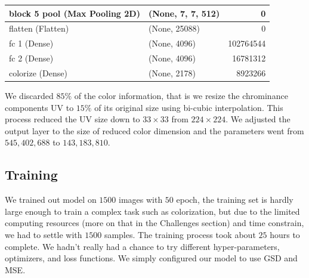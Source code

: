 \documentclass[12pt]{article}
\begin{document}
\begin{table}[H]
\begin{tabular}{|l|l|r|}
		block 5 pool (Max Pooling 2D) &  (None, 7, 7, 512)      &    0           \\ \hline 
		flatten (Flatten)             &  (None, 25088)          &    0           \\ \hline 
		fc 1 (Dense)                  &  (None, 4096)           &    102764544   \\ \hline 
		fc 2 (Dense)                  &  (None, 4096)           &    16781312    \\ \hline 
		colorize (Dense)              & (None, 2178)            &    8923266     \\ \hline 
	\end{tabular}
\end{table}


We discarded $85\%$ of the color information, that is we resize the chrominance components UV to $15\%$ of its original size using bi-cubic interpolation. This process reduced the UV size down to $33\times33$ from $224\times224$. We adjusted the output layer to the size of reduced color dimension and the parameters went from $545{,}402{,}688$ to $143{,}183{,}810$. 


\subsection{Training}
We trained out model on $1500$ images with $50$ epoch, the training set is hardly large enough to train a complex task such as colorization, but due to the limited computing resources (more on that in the Challenges section) and time constrain, we had to settle with $1500$ samples. The training process took about $25$ hours to complete. We hadn't really had a chance to try different hyper-parameters, optimizers, and loss functions. We simply configured our model to use GSD and MSE. 
\end{document}
